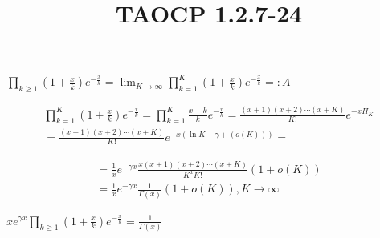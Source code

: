\documentclass{article}
\title{TAOCP 1.2.7\mbox{-}24}
\begin{document}
\maketitle

\( \prod_{k \geq 1} (1+\frac{x}{k})e^{-\frac{x}{k}} = \lim_{K \to \infty} \prod_{k = 1}^{K} (1+\frac{x}{k})e^{-\frac{x}{k}} =: A \)

\begin{multline*}
\prod_{k = 1}^{K} (1+\frac{x}{k})e^{-\frac{x}{k}} = \prod_{k = 1}^{K} \frac{x+k}{k}e^{-\frac{x}{k}} = \frac{(x+1)(x+2)\cdots(x+K)}{K!}e^{-xH_{K}} \\
= \frac{(x+1)(x+2)\cdots(x+K)}{K!}e^{-x(\ln{K} + \gamma + (o(K)))} =
\end{multline*}

\begin{multline*}
= \frac{1}{x}e^{-\gamma x} \frac{x(x+1)(x+2)\cdots(x+K)}{K^{x} K!} (1 + o(K)) \\
= \frac{1}{x} e^{-\gamma x} \frac{1}{\Gamma(x)} (1 + o(K)), K \to \infty
\end{multline*}

\( xe^{\gamma x} \prod_{k \geq 1} (1+\frac{x}{k})e^{-\frac{x}{k}} = \frac{1}{\Gamma(x)} \)
\end{document}
